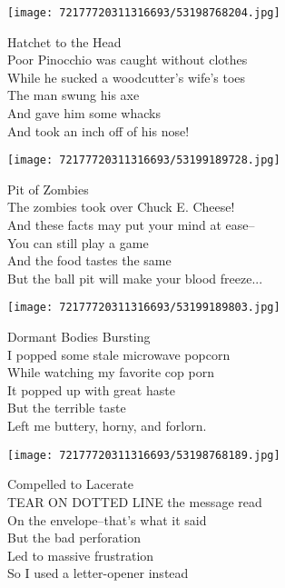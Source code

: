 \documentclass[10pt,letterpaper]{article}
\begin{document}
\begin{center}\texttt{[image: 72177720311316693/53198768204.jpg]}
\end{center}
\begin{center}
Hatchet to the Head\\
\vskip 0.2in
Poor Pinocchio was caught without clothes\\
While he sucked a woodcutter's wife's toes\\
The man swung his axe\\
And gave him some whacks\\
And took an inch off of his nose!\\
\end{center}
\pagebreak

\begin{center}\texttt{[image: 72177720311316693/53199189728.jpg]}
\end{center}
\begin{center}
Pit of Zombies\\
\vskip 0.2in
The zombies took over Chuck E. Cheese!\\
And these facts may put your mind at ease--\\
You can still play a game\\
And the food tastes the same\\
But the ball pit will make your blood freeze...\\
\end{center}
\pagebreak

\begin{center}\texttt{[image: 72177720311316693/53199189803.jpg]}
\end{center}
\begin{center}
Dormant Bodies Bursting\\
\vskip 0.2in
I popped some stale microwave popcorn\\
While watching my favorite cop porn\\
It popped up with great haste\\
But the terrible taste\\
Left me buttery, horny, and forlorn.\\
\end{center}
\pagebreak

\begin{center}\texttt{[image: 72177720311316693/53198768189.jpg]}
\end{center}
\begin{center}
Compelled to Lacerate\\
\vskip 0.2in
TEAR ON DOTTED LINE the message read\\
On the envelope--that's what it said\\
But the bad perforation\\
Led to massive frustration\\
So I used a letter-opener instead\\
\end{center}
\pagebreak
\end{document}
